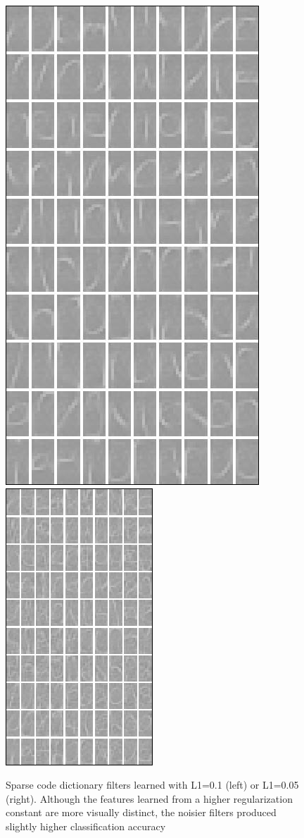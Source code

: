 \documentclass{article} %
\begin{document}
\begin{figure}
\centering
\includegraphics[scale=0.577]{figures/filters_100_clean.png}
\quad\quad\quad
\includegraphics[scale=1]{figures/filters_100_noisy.png}
\caption{Sparse code dictionary filters learned with L1=0.1 (left) or L1=0.05 (right). Although the features learned from a higher regularization constant are more visually distinct, the noisier filters produced slightly higher classification accuracy}
\end{figure}
\end{document}
